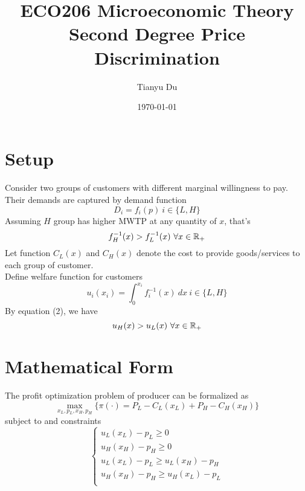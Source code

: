 \documentclass[11pt]{article}
\title{ECO206 Microeconomic Theory\\ \small Second Degree Price Discrimination \small}
\author{Tianyu Du}
\date{\today}
\begin{document}
	\maketitle
	
	\section{Setup}
	\paragraph{} Consider two groups of customers with different marginal willingness to pay. Their demands are captured by demand function
	\begin{equation}
		D_i = f_i (p)\ i \in \{L, H\}
	\end{equation}
	Assuming $H$ group has higher MWTP at any quantity of $x$, that's 
	\begin{equation}
		f_H^{-1}(x) > f_L^{-1}(x) \ \forall x \in \R_+
	\end{equation}
	Let function $C_L(x)$ and $C_H(x)$ denote the cost to provide goods/services to each group of customer.
	\\
	Define welfare function for customers
	\begin{equation}
		u_i(x_i) = \int_{0}^{x_i} f_i^{-1}(x)\ dx \ i \in \{L, H\}
	\end{equation}
	By equation (2), we have
	\begin{equation}
		u_H(x) > u_L(x) \ \forall x \in \mathbb{R}_+
	\end{equation}

	\section{Mathematical Form}
	The profit optimization problem of producer can be formalized as
	\begin{equation}
		\max_{x_L,p_L,x_H,p_H} \big \{\pi(\cdot) =  P_L - C_L(x_L) + P_H - C_H(x_H) \big \}
	\end{equation} 
	subject to  and  constraints
	\begin{equation}
		\begin{cases}
			u_L(x_L) - p_L \geq 0 \\
			u_H(x_H) - p_H \geq 0 \\
			u_L(x_L) - p_L \geq u_L(x_H) - p_H \\
			u_H(x_H) - p_H \geq u_H(x_L) - p_L \\
		\end{cases}
	\end{equation}
	
\end{document}
